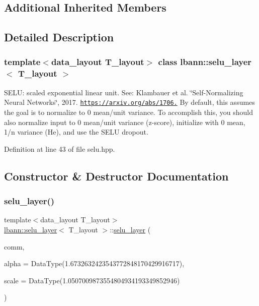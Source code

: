 \subsection*{Additional Inherited Members}


\subsection{Detailed Description}
\subsubsection*{template$<$data\+\_\+layout T\+\_\+layout$>$\newline
class lbann\+::selu\+\_\+layer$<$ T\+\_\+layout $>$}

S\+E\+LU\+: scaled exponential linear unit. See\+: Klambauer et al. \char`\"{}\+Self-\/\+Normalizing Neural Networks\char`\"{}, 2017. \href{https://arxiv.org/abs/1706.02515}{\tt https\+://arxiv.\+org/abs/1706.} By default, this assumes the goal is to normalize to 0 mean/unit variance. To accomplish this, you should also normalize input to 0 mean/unit variance (z-\/score), initialize with 0 mean, 1/n variance (He), and use the S\+E\+LU dropout. 

Definition at line 43 of file selu.\+hpp.



\subsection{Constructor \& Destructor Documentation}
\mbox{\label{classlbann_1_1selu__layer_ad71a99f25ddf2c07bc082a8e08f12cc2}} 
\subsubsection{\texorpdfstring{selu\+\_\+layer()}{selu\_layer()}}
{\footnotesize\ttfamily template$<$data\+\_\+layout T\+\_\+layout$>$ \\
\hyperlink{classlbann_1_1selu__layer}{lbann\+::selu\+\_\+layer}$<$ T\+\_\+layout $>$\+::\hyperlink{classlbann_1_1selu__layer}{selu\+\_\+layer} (\begin{DoxyParamCaption}\item[{\hyperlink{classlbann_1_1lbann__comm}{lbann\+\_\+comm} $\ast$}]{comm,  }\item[{Data\+Type}]{alpha = {\ttfamily DataType(1.6732632423543772848170429916717)},  }\item[{Data\+Type}]{scale = {\ttfamily DataType(1.0507009873554804934193349852946)} }\end{DoxyParamCaption})\hspace{0.3cm}{\ttfamily [inline]}}



